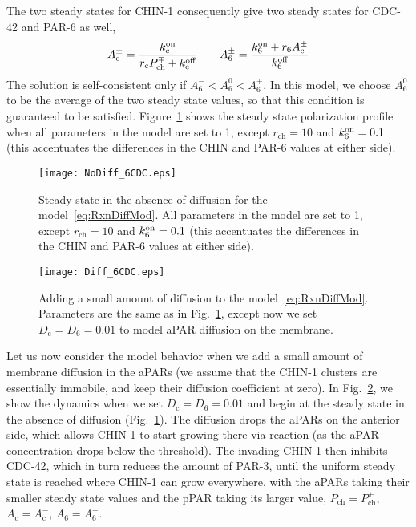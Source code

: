 \documentclass[11pt]{article}
\newcommand{\CDC}[1]{#1_{\text{c}}}
\newcommand{\6}[1]{#1_{\text{6}}}
\newcommand{\3}[1]{#1_{\text{3}}}
\newcommand{\CHIN}[1]{#1_{\text{ch}}}
\begin{document}
The two steady states for CHIN-1 consequently give two steady states for CDC-42 and PAR-6 as well, 
\begin{equation}
\label{eq:aPARSS}
\CDC{A}^\pm = \frac{\CDC{\kon}}{\CDC{r}\CHIN{P}^\mp + \CDC{\koff}} \qquad \6{A}^\pm = \frac{\6{\kon}+\6{r}\CDC{A}^\pm}{\6{\koff}}
\end{equation}
The solution is self-consistent only if $\6{A}^- < \6{A}^0 < \6{A}^+$. In this model, we choose $\6{A}^0$ to be the average of the two steady state values, so that this condition is guaranteed to be satisfied. Figure\ \ref{fig:NoDiff} shows the steady state polarization profile when all parameters in the model are set to 1, except $\CHIN{r}=10$ and $\6{\kon}=0.1$ (this accentuates the differences in the CHIN and PAR-6 values at either side).

\begin{figure}
\centering
\texttt{[image: NoDiff\_6CDC.eps]}
\caption{\label{fig:NoDiff} Steady state in the absence of diffusion for the model\ \eqref{eq:RxnDiffMod}. All parameters in the model are set to 1, except $\CHIN{r}=10$ and $\6{\kon}=0.1$ (this accentuates the differences in the CHIN and PAR-6 values at either side).}
\end{figure}

\begin{figure}
\centering
\texttt{[image: Diff\_6CDC.eps]}
\caption{\label{fig:SmDiff} Adding a small amount of diffusion to the model\ \eqref{eq:RxnDiffMod}. Parameters are the same as in Fig.\ \ref{fig:NoDiff}, except now we set $\CDC{D}=\6{D}=0.01$ to model aPAR diffusion on the membrane.}
\end{figure}

Let us now consider the model behavior when we add a small amount of membrane diffusion in the aPARs (we assume that the CHIN-1 clusters are essentially immobile, and keep their diffusion coefficient at zero). In Fig.\ \ref{fig:SmDiff}, we show the dynamics when we set $\CDC{D}=\6{D}=0.01$ and begin at the steady state in the absence of diffusion (Fig.\ \ref{fig:NoDiff}). The diffusion drops the aPARs on the anterior side, which allows CHIN-1 to start growing there via reaction (as the aPAR concentration drops below the threshold). The invading CHIN-1 then inhibits CDC-42, which in turn reduces the amount of PAR-3, until the uniform steady state is reached where CHIN-1 can grow everywhere, with the aPARs taking their smaller steady state values and the pPAR taking its larger value, $\CHIN{P}=\CHIN{P}^+$, $\CDC{A}=\CDC{A}^-$, $\6{A}=\6{A}^-$. 
\end{document}
